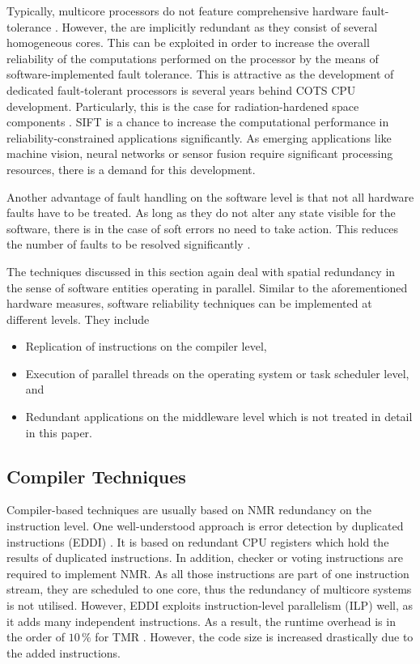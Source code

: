\documentclass[conference]{IEEEtran}
\begin{document}
Typically, multicore processors do not feature comprehensive hardware fault-tolerance \cite{Villalpando2011}. However, the are implicitly redundant as they consist of several homogeneous cores. This can be exploited in order to increase the overall reliability of the computations performed on the processor by the means of software-implemented fault tolerance. This is attractive as the development of dedicated fault-tolerant processors is several years behind COTS CPU development. Particularly, this is the case for radiation-hardened space components \cite{Nezzari2017}. SIFT is a chance to increase the computational performance in reliability-constrained applications significantly. As emerging applications like machine vision, neural networks or sensor fusion require significant processing resources, there is a demand for this development.

Another advantage of fault handling on the software level is that not all hardware faults have to be treated. As long as they do not alter any state visible for the software, there is in the case of soft errors no need to take action. This reduces the number of faults to be resolved significantly \cite{Walters2011}.

The techniques discussed in this section again deal with spatial redundancy in the sense of software entities operating in parallel. Similar to the aforementioned hardware measures, software reliability techniques can be implemented at different levels. They include
\begin{itemize}
	\item Replication of instructions on the compiler level,
	\item Execution of parallel threads on the operating system or task scheduler level, and
	\item Redundant applications on the middleware level which is not treated in detail in this paper.
\end{itemize}

\subsection{Compiler Techniques}

Compiler-based techniques are usually based on NMR redundancy on the instruction level. One well-understood approach is error detection by duplicated instructions (EDDI) \cite{Oh2002}. It is based on redundant CPU registers which hold the results of duplicated instructions. In addition, checker or voting instructions are required to implement NMR. As all those instructions are part of one instruction stream, they are scheduled to one core, thus the redundancy of multicore systems is not utilised. However, EDDI exploits instruction-level parallelism (ILP) well, as it adds many independent instructions. As a result, the runtime overhead is in the order of $10\,\%$ for TMR \cite{Nezzari2017}. However, the code size is increased drastically due to the added instructions.
\end{document}
